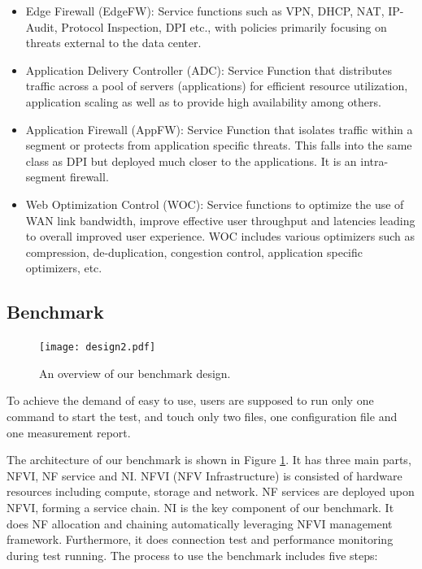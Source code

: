\documentclass{sig-alternate-10pt}
\begin{document}
\begin{itemize}
\item
Edge Firewall (EdgeFW): Service functions such as VPN, DHCP, NAT, IP-Audit, Protocol Inspection, DPI etc., with policies primarily focusing on threats external to the data center.

\item
Application Delivery Controller (ADC): Service Function that distributes traffic across a pool of servers (applications) for efficient resource utilization, application scaling as well as to provide high availability among others.
       
\item
Application Firewall (AppFW): Service Function that isolates traffic within a segment or protects from application specific threats. This falls into the same class as DPI but deployed much closer to the applications. It is an intra-segment firewall.

\item
Web Optimization Control (WOC): Service functions to optimize the use of WAN link bandwidth, improve effective user throughput and latencies leading to overall improved user experience. WOC includes various optimizers such as compression, de-duplication, congestion control, application specific optimizers, etc. %
\end{itemize}


\subsection{Benchmark}

\begin{figure}[!t]
\centering
\texttt{[image: design2.pdf]}
\caption{An overview of our benchmark design.}
\label{design}
\end{figure}

To achieve the demand of easy to use, 
users are supposed to run only one command to start the test, 
and touch only two files, 
one configuration file and one measurement report. 

The architecture of our benchmark is shown in Figure \ref{design}. 
It has three main parts, NFVI, NF service and NI.
NFVI (NFV Infrastructure) is consisted of hardware resources 
including compute, storage and network. 
NF services are deployed upon NFVI, forming a service chain. 
NI is the key component of our benchmark. 
It does NF allocation and chaining automatically leveraging NFVI management framework.
Furthermore, it does connection test and performance monitoring during test running.
The process to use the benchmark includes five steps: 
\end{document}

